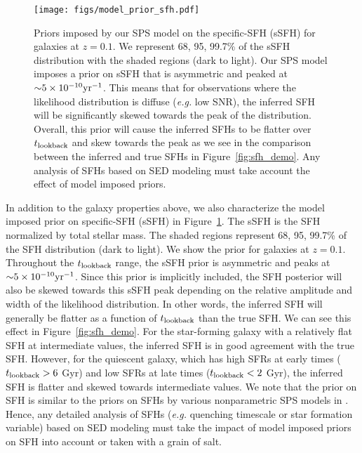 \begin{figure}
\begin{center}
\texttt{[image: figs/model\_prior\_sfh.pdf]}
    \caption{
        Priors imposed by our SPS model on the specific-SFH (sSFH) for galaxies
        at $z=0.1$. 
        We represent 68, 95, 99.7\% of the sSFH distribution with the shaded
        regions (dark to light). 
        Our SPS model imposes a prior on sSFH that is asymmetric and peaked at 
        ${\sim}5\times10^{-10}{\rm yr}^{-1}$. 
        This means that for observations where the likelihood distribution is
        diffuse (\emph{e.g.} low SNR), the inferred SFH will be significantly
        skewed towards the peak of the distribution. 
        Overall, this prior will cause the inferred SFHs to be flatter over
        $t_{\rm lookback}$ and skew towards the peak as we see in the comparison between
        the inferred and true SFHs in Figure~\ref{fig:sfh_demo}. 
        Any analysis of SFHs based on SED modeling must take account the effect
        of model imposed priors. 
    }\label{fig:sfh_prior}
\end{center}
\end{figure}
In addition to the galaxy properties above, we also characterize the model
imposed prior on specific-SFH (sSFH) in Figure~\ref{fig:sfh_prior}. 
The sSFH is the SFH normalized by total stellar mass. 
The shaded regions represent 68, 95, 99.7\% of the SFH distribution (dark to
light). 
We show the prior for galaxies at $z=0.1$. 
Throughout the $t_{\rm lookback}$ range, the sSFH prior is asymmetric and peaks at
${\sim}5\times10^{-10}{\rm yr}^{-1}$. 
Since this prior is implicitly included, the SFH posterior will also be skewed
towards this sSFH peak depending on the relative amplitude and width of the
likelihood distribution. 
In other words, the inferred SFH will generally be flatter as a function of
$t_{\rm lookback}$ than the true SFH. 
We can see this effect in Figure~\ref{fig:sfh_demo}. 
For the star-forming galaxy with a relatively flat SFH at intermediate values,
the inferred SFH is in good agreement with the true SFH. 
However, for the quiescent galaxy, which has high SFRs at early times ($t_{\rm lookback} >
6$ Gyr) and low SFRs at late times ($t_{\rm lookback} < 2$ Gyr), the inferred SFH is
flatter and skewed towards intermediate values. 
We note that the prior on SFH is similar to the priors on SFHs by various
nonparametric SPS models in \cite{leja2019}. 
Hence, any detailed analysis of SFHs (\emph{e.g.} quenching timescale or star
formation variable) based on SED modeling must take the impact of model imposed
priors on SFH into account or taken with a grain of salt.  

